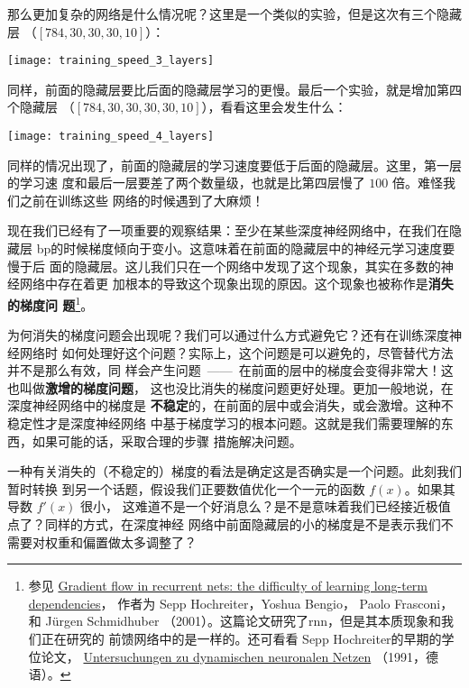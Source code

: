 那么更加复杂的网络是什么情况呢？这里是一个类似的实验，但是这次有三个隐藏层
（$[784, 30, 30, 30, 10]$）：
\begin{center}
  \texttt{[image: training\_speed\_3\_layers]}
\end{center}
 
同样，前面的隐藏层要比后面的隐藏层学习的更慢。最后一个实验，就是增加第四个隐藏层
（$[784, 30, 30, 30, 30, 10]$），看看这里会发生什么：
\begin{center}
  \texttt{[image: training\_speed\_4\_layers]}
\end{center}
 
同样的情况出现了，前面的隐藏层的学习速度要低于后面的隐藏层。这里，第一层的学习速
度和最后一层要差了两个数量级，也就是比第四层慢了 $100$ 倍。难怪我们之前在训练这些
网络的时候遇到了大麻烦！
 
现在我们已经有了一项重要的观察结果：至少在某些深度神经网络中，在我们在隐藏层%
\gls*{bp}的时候梯度倾向于变小。这意味着在前面的隐藏层中的神经元学习速度要慢于后
面的隐藏层。这儿我们只在一个网络中发现了这个现象，其实在多数的神经网络中存在着更
加根本的导致这个现象出现的原因。这个现象也被称作是\textbf{消失的梯度问
  题}\footnote{参见
  \href{http://citeseerx.ist.psu.edu/viewdoc/summary?doi=10.1.1.24.7321}{Gradient
    flow in recurrent nets: the difficulty of learning long-term dependencies}，
  作者为 Sepp Hochreiter，Yoshua Bengio， Paolo Frasconi， 和 Jürgen
  Schmidhuber （2001）。这篇论文研究了\gls*{rnn}，但是其本质现象和我们正在研究的
  前馈网络中的是一样的。还可看看 Sepp Hochreiter的早期的学位论文，
  \href{http://www.idsia.ch/~juergen/SeppHochreiter1991ThesisAdvisorSchmidhuber.pdf}{Untersuchungen
    zu dynamischen neuronalen Netzen} （1991，德语）。}。
 
为何消失的梯度问题会出现呢？我们可以通过什么方式避免它？还有在训练深度神经网络时
如何处理好这个问题？实际上，这个问题是可以避免的，尽管替代方法并不是那么有效，同
样会产生问题~——~在前面的层中的梯度会变得非常大！这也叫做\textbf{激增的梯度问题}，
这也没比消失的梯度问题更好处理。更加一般地说，在深度神经网络中的梯度是%
\textbf{不稳定}的，在前面的层中或会消失，或会激增。这种不稳定性才是深度神经网络
中基于梯度学习的根本问题。这就是我们需要理解的东西，如果可能的话，采取合理的步骤
措施解决问题。
 
一种有关消失的（不稳定的）梯度的看法是确定这是否确实是一个问题。此刻我们暂时转换
到另一个话题，假设我们正要数值优化一个一元的函数 $f(x)$。如果其导数 $f'(x)$ 很小，
这难道不是一个好消息么？是不是意味着我们已经接近极值点了？同样的方式，在深度神经
网络中前面隐藏层的小的梯度是不是表示我们不需要对权重和偏置做太多调整了？
 
